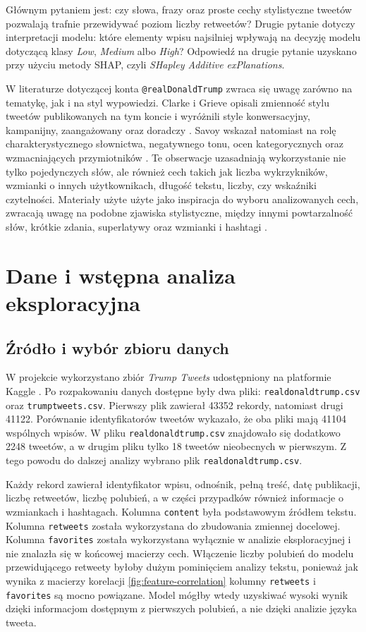 \documentclass[12pt, a4paper, oneside]{scrreprt}
\begin{document}
Głównym pytaniem jest: czy słowa, frazy oraz proste cechy stylistyczne tweetów pozwalają
trafnie przewidywać poziom liczby retweetów? Drugie pytanie dotyczy interpretacji modelu:
które elementy wpisu najsilniej wpływają na decyzję modelu dotyczącą
klasy \emph{Low}, \emph{Medium} albo \emph{High}? Odpowiedź na drugie pytanie uzyskano
przy użyciu metody SHAP, czyli \emph{SHapley Additive exPlanations}.

W literaturze dotyczącej konta \texttt{@realDonaldTrump} zwraca się uwagę zarówno na
tematykę, jak i na styl wypowiedzi. Clarke i Grieve opisali zmienność stylu tweetów
publikowanych na tym koncie i wyróżnili style konwersacyjny, kampanijny, zaangażowany
oraz doradczy \cite{clarke2019}. Savoy wskazał natomiast na rolę charakterystycznego
słownictwa, negatywnego tonu, ocen kategorycznych oraz wzmacniających przymiotników
\cite{savoy2022}. Te obserwacje uzasadniają wykorzystanie nie tylko pojedynczych słów,
ale również cech takich jak liczba wykrzykników, wzmianki o innych użytkownikach,
długość tekstu, liczby, czy wskaźniki czytelności. Materiały użyte użyte jako inspiracja
do wyboru analizowanych cech, zwracają uwagę na podobne zjawiska stylistyczne,
między innymi powtarzalność słów, krótkie zdania, superlatywy oraz wzmianki i hashtagi
\cite{textInspector2022,theConversation2018,healy2018}.

\chapter{Dane i wstępna analiza eksploracyjna}

\section{Źródło i wybór zbioru danych}

W projekcie wykorzystano zbiór \emph{Trump Tweets} udostępniony
na platformie Kaggle \cite{kaggleTrumpTweets}. Po rozpakowaniu danych dostępne
były dwa pliki: \texttt{realdonaldtrump.csv} oraz \texttt{trumptweets.csv}.
Pierwszy plik zawierał \num{43352} rekordy, natomiast drugi \num{41122}.
Porównanie identyfikatorów tweetów wykazało, że oba pliki mają \num{41104} wspólnych
wpisów. W pliku \texttt{realdonaldtrump.csv} znajdowało się dodatkowo \num{2248} tweetów,
a w drugim pliku tylko \num{18} tweetów nieobecnych w pierwszym. Z tego powodu do dalszej
analizy wybrano plik \texttt{realdonaldtrump.csv}.

Każdy rekord zawierał identyfikator wpisu, odnośnik, pełną treść, datę publikacji,
liczbę retweetów, liczbę polubień, a w części przypadków również informacje o wzmiankach
i hashtagach. Kolumna \texttt{content} była podstawowym źródłem tekstu.
Kolumna \texttt{retweets} została wykorzystana do zbudowania zmiennej docelowej.
Kolumna \texttt{favorites} została wykorzystana wyłącznie w analizie eksploracyjnej i nie znalazła
się w końcowej macierzy cech. Włączenie liczby polubień do modelu przewidującego retweety
byłoby dużym pominięciem analizy tekstu, ponieważ jak wynika z macierzy korelacji \ref{fig:feature-correlation}
kolumny \texttt{retweets} i \texttt{favorites} są mocno powiązane. Model mógłby wtedy uzyskiwać
wysoki wynik dzięki informacjom dostępnym z pierwszych polubień, a nie dzięki analizie języka tweeta.
\end{document}
